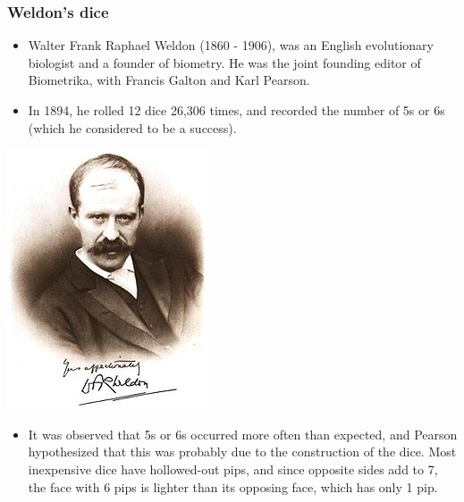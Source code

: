 \documentclass[notes,11pt, aspectratio=169]{beamer}
\begin{document}

\begin{frame}
\frametitle{Weldon's dice}

{
\begin{itemize}

\item Walter Frank Raphael Weldon (1860 - 1906), was an English evolutionary biologist and a founder of biometry. He was the joint founding editor of Biometrika, with Francis Galton and Karl Pearson.

\item In 1894, he rolled 12 dice 26,306 times, and recorded the number of 5s or 6s (which he considered to be a success).

\end{itemize}
}
{
\begin{center}
\includegraphics[width=\textwidth]{graphs/weldon}
\end{center}
}
\begin{itemize}

\item It was observed that 5s or 6s occurred more often than expected, and Pearson hypothesized that this was probably due to the construction of the dice. Most inexpensive dice have hollowed-out pips, and since opposite sides add to 7, the face with 6 pips is lighter than its opposing face, which has only 1 pip.

\end{itemize}

\end{frame}
\end{document}
